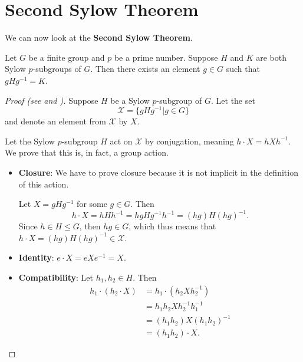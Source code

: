 \section{Second Sylow Theorem}
We can now look at the \textbf{Second Sylow Theorem}.
\begin{theorem}[Sylow II]\label{thrm-sylow-2}
    Let $G$ be a finite group and $p$ be a prime number. Suppose $H$ and $K$ are both Sylow $p$-subgroups of $G$. Then there exists an element $g \in G$ such that $gHg^{-1} = K$.
\end{theorem}
\begin{proof}[Proof (see {\cite[Theorem 11.10]{humphreys_1996}} and {\cite[pp.~3--5]{mann_2011}})]
    Suppose $H$ be a Sylow $p$-subgroup of $G$. Let the set
    \[
        \mathcal{X} = \{gHg^{-1} \vert g \in G\}
    \]
    and denote an element from $\mathcal{X}$ by $X$.

    Let the Sylow $p$-subgroup $H$ act on $\mathcal{X}$ by conjugation, meaning $h \cdot X = hXh^{-1}$. We prove that this is, in fact, a group action.
    
    \begin{itemize}
        \item \textbf{Closure}: We have to prove closure because it is not implicit in the definition of this action.

        Let $X = gHg^{-1}$ for some $g \in G$. Then
        \[
            h\cdot X = hHh^{-1} = hgHg^{-1}h^{-1} = (hg)H(hg)^{-1}.
        \]
        Since $h \in H \leq G$, then $hg \in G$, which thus means that $h \cdot X = (hg)H(hg)^{-1} \in \mathcal{X}$.
        \item \textbf{Identity}: $e \cdot X = eXe^{-1} = X$.
        \item \textbf{Compatibility}: Let $h_1, h_2 \in H$. Then
        \begin{align*}
            h_1 \cdot (h_2 \cdot X) &= h_1 \cdot (h_2Xh_2^{-1})\\
            &= h_1h_2Xh_2^{-1}h_1^{-1}\\
            &= (h_1h_2)X(h_1h_2)^{-1}\\
            &= (h_1h_2) \cdot X.
        \end{align*}
    \end{itemize}

    


\end{proof}
